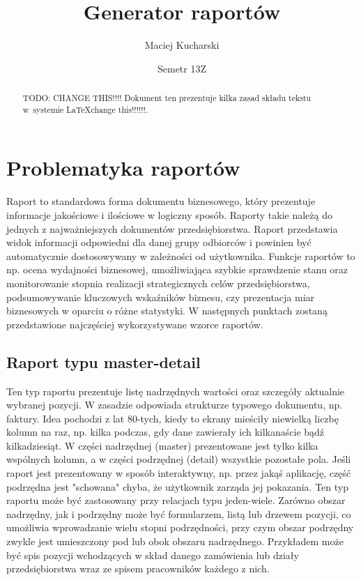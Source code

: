 \documentclass[11pt,a4paper]{article}
\title{Generator raportów}
\author{Maciej Kucharski}
\date{Semetr 13Z}
\begin{document}
\maketitle
 
\begin{abstract}
TODO: CHANGE THIS!!!!
Dokument ten prezentuje kilka zasad składu tekstu 
w~systemie \LaTeX change this!!!!!!. 
\end{abstract}
\section{Problematyka raportów}\label{sec:raport}
Raport to standardowa forma dokumentu biznesowego, który prezentuje informacje jakościowe i ilościowe w logiczny sposób. Raporty takie należą do jednych z najważniejszych dokumentów przedsiębiorstwa. Raport przedstawia widok informacji odpowiedni dla danej grupy odbiorców i powinien być automatycznie dostosowywany w zależności od użytkownika. Funkcje raportów to np.
ocena wydajności biznesowej, umożliwiająca szybkie sprawdzenie stanu oraz monitorowanie stopnia realizacji strategicznych celów przedsiębiorstwa, podsumowywanie kluczowych wskaźników biznesu, czy prezentacja miar biznesowych w oparciu o różne statystyki. W następnych punktach zostaną przedstawione najczęściej wykorzystywane wzorce raportów.
\subsection{Raport typu master-detail}\label{sec:master_detail}
Ten typ raportu prezentuje listę nadrzędnych wartości oraz szczegóły aktualnie wybranej pozycji. W zasadzie odpowiada strukturze typowego dokumentu, np. faktury. Idea pochodzi z lat 80-tych, kiedy to ekrany mieściły niewielką liczbę kolumn na raz, np. kilka podczas, gdy dane zawierały ich kilkanaście bądź kilkadziesiąt. W części nadrzędnej (master) prezentowane jest tylko kilka wspólnych kolumn, a w części podrzędnej (detail) wszystkie pozostałe pola. Jeśli raport jest prezentowany w sposób interaktywny, np. przez jakąś aplikację, część podrzędna jest "schowana" chyba, że użytkownik zarząda jej pokazania. Ten typ raportu może być zastosowany przy relacjach typu jeden-wiele. Zarówno obszar nadrzędny, jak i podrzędny może być formularzem, listą lub drzewem pozycji, co umożliwia wprowadzanie wielu stopni podrzędności, przy czym obszar podrzędny zwykle jest umieszczony pod lub obok obszaru nadrzędnego. Przykładem może być spis pozycji wchodzących w skład danego zamówienia lub działy przedsiębiorstwa wraz ze spisem pracowników każdego z nich.
\end{document}

